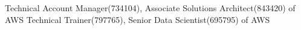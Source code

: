 

\begin{cvskills}

  \cvskill
    {Technical Account Manager(734104), Associate Solutions Architect(843420) of AWS}
    {}
  \cvskill
    {Technical Trainer(797765), Senior Data Scientist(695795) of AWS}
    {}
\end{cvskills}